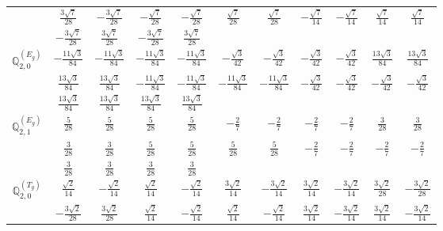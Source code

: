 \documentclass[fleqn,10pt,landscape]{article}
\begin{document}
\begin{itemize}
{\begin{center}
\begin{longtable}{ccccccccccc}
& $ \frac{3 \sqrt{7}}{28} $ & $ - \frac{3 \sqrt{7}}{28} $ & $ - \frac{\sqrt{7}}{28} $ & $ - \frac{\sqrt{7}}{28} $ & $ \frac{\sqrt{7}}{28} $ & $ \frac{\sqrt{7}}{28} $ & $ - \frac{\sqrt{7}}{14} $ & $ - \frac{\sqrt{7}}{14} $ & $ \frac{\sqrt{7}}{14} $ & $ \frac{\sqrt{7}}{14} $ \\
& $ - \frac{3 \sqrt{7}}{28} $ & $ \frac{3 \sqrt{7}}{28} $ & $ - \frac{3 \sqrt{7}}{28} $ & $ \frac{3 \sqrt{7}}{28} $ & $  $ & $  $ & $  $ & $  $ & $  $ & $  $ \\ \hline
$\mathbb{Q}_{2,0}^{(E_{g})}$ & $ - \frac{11 \sqrt{3}}{84} $ & $ - \frac{11 \sqrt{3}}{84} $ & $ - \frac{11 \sqrt{3}}{84} $ & $ - \frac{11 \sqrt{3}}{84} $ & $ - \frac{\sqrt{3}}{42} $ & $ - \frac{\sqrt{3}}{42} $ & $ - \frac{\sqrt{3}}{42} $ & $ - \frac{\sqrt{3}}{42} $ & $ \frac{13 \sqrt{3}}{84} $ & $ \frac{13 \sqrt{3}}{84} $ \\
& $ \frac{13 \sqrt{3}}{84} $ & $ \frac{13 \sqrt{3}}{84} $ & $ - \frac{11 \sqrt{3}}{84} $ & $ - \frac{11 \sqrt{3}}{84} $ & $ - \frac{11 \sqrt{3}}{84} $ & $ - \frac{11 \sqrt{3}}{84} $ & $ - \frac{\sqrt{3}}{42} $ & $ - \frac{\sqrt{3}}{42} $ & $ - \frac{\sqrt{3}}{42} $ & $ - \frac{\sqrt{3}}{42} $ \\
& $ \frac{13 \sqrt{3}}{84} $ & $ \frac{13 \sqrt{3}}{84} $ & $ \frac{13 \sqrt{3}}{84} $ & $ \frac{13 \sqrt{3}}{84} $ & $  $ & $  $ & $  $ & $  $ & $  $ & $  $ \\ \hline
$\mathbb{Q}_{2,1}^{(E_{g})}$ & $ \frac{5}{28} $ & $ \frac{5}{28} $ & $ \frac{5}{28} $ & $ \frac{5}{28} $ & $ - \frac{2}{7} $ & $ - \frac{2}{7} $ & $ - \frac{2}{7} $ & $ - \frac{2}{7} $ & $ \frac{3}{28} $ & $ \frac{3}{28} $ \\
& $ \frac{3}{28} $ & $ \frac{3}{28} $ & $ \frac{5}{28} $ & $ \frac{5}{28} $ & $ \frac{5}{28} $ & $ \frac{5}{28} $ & $ - \frac{2}{7} $ & $ - \frac{2}{7} $ & $ - \frac{2}{7} $ & $ - \frac{2}{7} $ \\
& $ \frac{3}{28} $ & $ \frac{3}{28} $ & $ \frac{3}{28} $ & $ \frac{3}{28} $ & $  $ & $  $ & $  $ & $  $ & $  $ & $  $ \\ \hline
$\mathbb{Q}_{2,0}^{(T_{g})}$ & $ \frac{\sqrt{2}}{14} $ & $ - \frac{\sqrt{2}}{14} $ & $ \frac{\sqrt{2}}{14} $ & $ - \frac{\sqrt{2}}{14} $ & $ \frac{3 \sqrt{2}}{14} $ & $ - \frac{3 \sqrt{2}}{14} $ & $ \frac{3 \sqrt{2}}{14} $ & $ - \frac{3 \sqrt{2}}{14} $ & $ \frac{3 \sqrt{2}}{28} $ & $ - \frac{3 \sqrt{2}}{28} $ \\
& $ - \frac{3 \sqrt{2}}{28} $ & $ \frac{3 \sqrt{2}}{28} $ & $ \frac{\sqrt{2}}{14} $ & $ - \frac{\sqrt{2}}{14} $ & $ \frac{\sqrt{2}}{14} $ & $ - \frac{\sqrt{2}}{14} $ & $ \frac{3 \sqrt{2}}{14} $ & $ - \frac{3 \sqrt{2}}{14} $ & $ \frac{3 \sqrt{2}}{14} $ & $ - \frac{3 \sqrt{2}}{14} $ \\

\end{longtable}
\end{center}}
\end{itemize}
\end{document}
